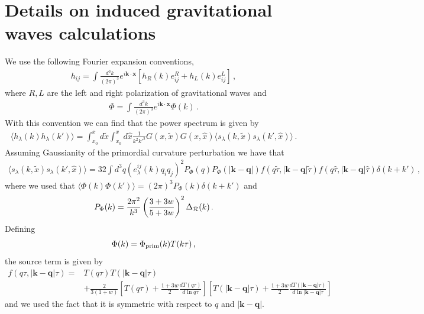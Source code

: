\documentclass[aps,10pt,prd,groupedaddress,nofootinbib,notitlepage,eqsecnum,preprintnumbers]{revtex4-1}
\begin{document}
\section{Details on induced gravitational waves calculations \label{app:fourier}}
We use the following Fourier expansion conventions,
\begin{align}
h_{ij}=\int \frac{d^3k}{(2\pi)^3} e^{i\mathbf{k}\cdot\mathbf{x}}\left[h_R(k) {e}_{ij}^R+h_L(k) {e}_{ij}^L\right]\,,
\end{align}
where $R,L$ are the left and right polarization of gravitational waves and
\begin{align}
\Phi=\int \frac{d^3k}{(2\pi)^3} e^{i\mathbf{k}\cdot\mathbf{x}}\Phi(k)\,.
\end{align}
With this convention we can find that the power spectrum is given by
\begin{align}
\langle h_\lambda(k)h_\lambda(k')\rangle=\int_{x_0}^x d\tilde x \int_{ x_0}^x d\hat x \frac{1}{k^2{k'}^2}G(x,\tilde x)G(x,\hat x)\langle s_\lambda(k,\tilde x)s_\lambda(k',\hat x)\rangle\,.
\end{align}
Assuming Gaussianity of the primordial curvature perturbation we have that
\begin{align}
\langle s_\lambda(k,\tilde x)s_\lambda(k',\hat x)\rangle=32\int d^3q \left(e_\lambda^{ij}(k)q_iq_j\right)^2 P_\Phi(q)P_\Phi(|\mathbf{k}-\mathbf{q}|)f(q\tilde\tau,|\mathbf{k}-\mathbf{q}|\tilde\tau)f(q\hat\tau,|\mathbf{k}-\mathbf{q}|\hat\tau)\delta(k+k')\,,
\end{align}
where we used that $\langle \Phi(k)\Phi(k')\rangle=(2\pi)^3P_\Phi(k)\delta(k+k')$ and
\begin{align}
 P_\Phi(k)=\frac{2\pi^2}{k^3}\left(\frac{3+3w}{5+3w}\right)^2 \Delta_{\cal R}(k)\,.
 \end{align}
Defining
\begin{align}
\Phi(k)=\Phi_{\rm prim}(k)T(k\tau)\,,
\end{align}
the source term is given by
\begin{align}
f(q\tau,|\mathbf{k}-\mathbf{q}|\tau)=&T(q\tau)T(|\mathbf{k}-\mathbf{q}|\tau)\nonumber\\&+\frac{2}{3(1+w)}\left[T(q\tau)+\frac{1+3w}{2}\frac{dT(q\tau)}{d\ln q\tau}\right]\left[T(|\mathbf{k}-\mathbf{q}|\tau)+\frac{1+3w}{2}\frac{dT(|\mathbf{k}-\mathbf{q}|\tau)}{d\ln |\mathbf{k}-\mathbf{q}|\tau}\right]
\end{align}
and we used the fact that it is symmetric with respect to $q$ and $|\mathbf{k}-\mathbf{q}|$. 
\end{document}
